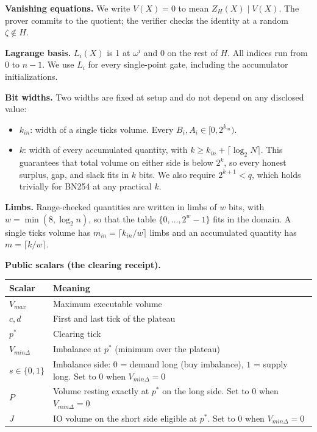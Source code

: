 \textbf{Vanishing equations.} We write \(V(X) = 0\) to mean \(Z_H(X) \mid V(X)\). The prover commits to the quotient; the verifier checks the identity at a random \(\zeta \notin H\).

\textbf{Lagrange basis.} \(L_i(X)\) is 1 at \(\omega^i\) and 0 on the rest of \(H\). All indices run from 0 to \(n-1\). We use \(L_i\) for every single-point gate, including the accumulator initializations.

\textbf{Bit widths.} Two widths are fixed at setup and do not depend on any disclosed value:

\begin{itemize}
\item
  \(k_{in}\): width of a single tick\textquotesingle s volume. Every \(B_i, A_i \in [0, 2^{k_{in}})\).
\item
  \(k\): width of every accumulated quantity, with \(k \ge k_{in} + \lceil \log_2 N \rceil\). This guarantees that total volume on either side is below \(2^k\), so every honest surplus, gap, and slack fits in \(k\) bits. We also require \(2^{k+1} < q\), which holds trivially for BN254 at any practical \(k\).
\end{itemize}

\textbf{Limbs.} Range-checked quantities are written in limbs of \(w\) bits, with \(w = \min(8, \log_2 n)\), so that the table \(\{0, \ldots, 2^w - 1\}\) fits in the domain. A single tick\textquotesingle s volume has \(m_{in} = \lceil k_{in}/w \rceil\) limbs and an accumulated quantity has \(m = \lceil k/w \rceil\).

\textbf{Public scalars (the clearing receipt).}

\begin{longtable}[]{@{}ll@{}}
\toprule\noalign{}
Scalar & Meaning \\
\midrule\noalign{}
\endhead
\bottomrule\noalign{}
\endlastfoot
\(V_{max}\) & Maximum executable volume \\
\(c, d\) & First and last tick of the plateau \\
\(p^*\) & Clearing tick \\
\(V_{min\Delta}\) & Imbalance at \(p^*\) (minimum over the plateau) \\
\(s \in \{0,1\}\) & Imbalance side: \(0\) = demand long (buy imbalance), \(1\) = supply long. Set to \(0\) when \(V_{min\Delta} = 0\) \\
\(P\) & Volume resting exactly at \(p^*\) on the long side. Set to \(0\) when \(V_{min\Delta} = 0\) \\
\(J\) & IO volume on the short side eligible at \(p^*\). Set to \(0\) when \(V_{min\Delta} = 0\) \\
\end{longtable}

